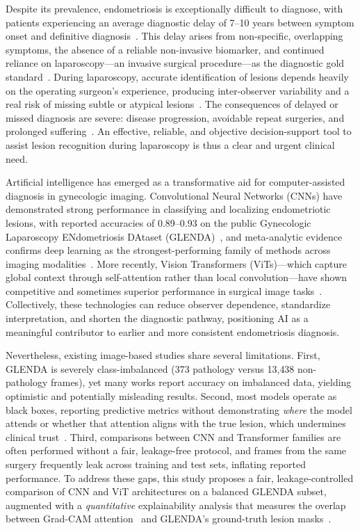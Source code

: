 \documentclass[journal]{IEEEtran}
\begin{document}
Despite its prevalence, endometriosis is exceptionally difficult to diagnose, with patients
experiencing an average diagnostic delay of 7--10 years between symptom onset and definitive
diagnosis~\cite{ref_e3,ref_d1}. This delay arises from non-specific, overlapping symptoms, the
absence of a reliable non-invasive biomarker, and continued reliance on laparoscopy---an invasive
surgical procedure---as the diagnostic gold standard~\cite{ref_a3}. During laparoscopy, accurate
identification of lesions depends heavily on the operating surgeon's experience, producing
inter-observer variability and a real risk of missing subtle or atypical lesions~\cite{ref_a3,ref_a10}.
The consequences of delayed or missed diagnosis are severe: disease progression, avoidable repeat
surgeries, and prolonged suffering~\cite{ref_e4}. An effective, reliable, and objective
decision-support tool to assist lesion recognition during laparoscopy is thus a clear and urgent
clinical need.

Artificial intelligence has emerged as a transformative aid for computer-assisted diagnosis in
gynecologic imaging. Convolutional Neural Networks (CNNs) have demonstrated strong performance in
classifying and localizing endometriotic lesions, with reported accuracies of 0.89--0.93 on the
public Gynecologic Laparoscopy ENdometriosis DAtaset (GLENDA)~\cite{ref_a1,ref_a2}, and
meta-analytic evidence confirms deep learning as the strongest-performing family of methods across
imaging modalities~\cite{ref_e2}. More recently, Vision Transformers (ViTs)---which capture global
context through self-attention rather than local convolution---have shown competitive and sometimes
superior performance in surgical image tasks~\cite{ref_a9}. Collectively, these technologies can
reduce observer dependence, standardize interpretation, and shorten the diagnostic pathway,
positioning AI as a meaningful contributor to earlier and more consistent endometriosis diagnosis.

Nevertheless, existing image-based studies share several limitations. First, GLENDA is severely
class-imbalanced (373 pathology versus 13{,}438 non-pathology frames), yet many works report
accuracy on imbalanced data, yielding optimistic and potentially misleading results. Second, most
models operate as black boxes, reporting predictive metrics without demonstrating \emph{where} the
model attends or whether that attention aligns with the true lesion, which undermines clinical
trust~\cite{ref_a1,ref_e4}. Third, comparisons between CNN and Transformer families are often
performed without a fair, leakage-free protocol, and frames from the same surgery frequently leak
across training and test sets, inflating reported performance. To address these gaps, this study
proposes a fair, leakage-controlled comparison of CNN and ViT architectures on a balanced GLENDA
subset, augmented with a \emph{quantitative} explainability analysis that measures the overlap
between Grad-CAM attention~\cite{ref_gradcam} and GLENDA's ground-truth lesion masks~\cite{ref_a4}.
\end{document}
